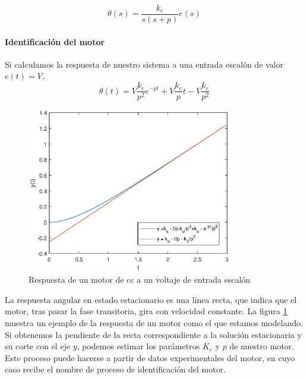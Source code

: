 \documentclass[10pt,a4paper]{report}
\begin{document}
\begin{equation}
\theta(s) = \frac{k_e}{s(s+p)}e(s)
\end{equation}

\paragraph{Identificación del motor} Si calculamos la respuesta de nuestro sistema a una entrada escalón de valor $e(t) = V$,
\begin{equation}\label{eq314}
\theta(t) = V\frac{k_e}{p^2}e^{-pt}+V\frac{k_e}{p}t -V\frac{k_e}{p^2} 
\end{equation}

\begin{figure}
\centering
\includegraphics[width=0.8\textwidth]{resq.eps}
\caption{Respuesta de un motor de cc a un voltaje de entrada escalón}\label{f22}
\end{figure}

La respuesta angular en estado estacionario es una línea recta, que indica que el motor, tras pasar la fase transitoria, gira con velocidad constante. La figura \ref{f22} muestra un ejemplo de la respuesta de un motor como el que estamos modelando. Si obtenemos la pendiente de la recta correspondiente a la solución estacionaria y su corte con el eje $y$, podemos estimar los parámetros $K_e$ y $p$ de nuestro motor. Este proceso puede hacerse a partir de datos experimentales del motor, en cuyo caso recibe el nombre de proceso de identificación del motor.
\end{document}
